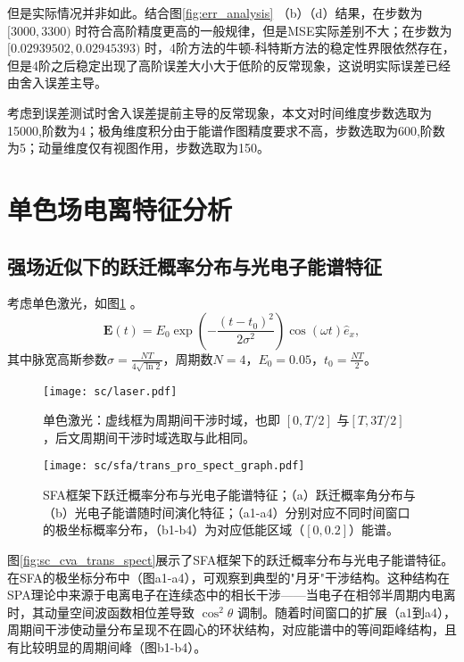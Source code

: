  但是实际情况并非如此。结合图\ref{fig:err_analysis} （b）（d）结果，在步数为$[3000, 3300)$ 时符合高阶精度更高的一般规律，但是MSE实际差别不大；在步数为$[0.02939502, 0.02945393)$ 时，4阶方法的牛顿-科特斯方法的稳定性界限依然存在，但是4阶之后稳定出现了高阶误差大小大于低阶的反常现象，这说明实际误差已经由舍入误差主导。

考虑到误差测试时舍入误差提前主导的反常现象，本文对时间维度步数选取为15000,阶数为4；极角维度积分由于能谱作图精度要求不高，步数选取为600,阶数为5；动量维度仅有视图作用，步数选取为150。

%
\section{单色场电离特征分析}
\subsection{强场近似下的跃迁概率分布与光电子能谱特征}
考虑单色激光，如图\ref{fig:sc_laser} 。
\begin{equation}
	\mathbf{E}(t) = E_0 \exp\left(-\frac{(t - t_0)^2}{2\sigma^2}\right) \cos(\omega t) \hat e_x,
	\label{eq:sc_laser}
\end{equation}
其中脉宽高斯参数$\sigma = \frac{NT}{4\sqrt{\ln{2}}}$，周期数$N = 4$，$E_0 = 0.05$，$t_0 = \frac{NT}{2}$。

\begin{figure}[h]  %
	\centering
	\texttt{[image: sc/laser.pdf]}
	\caption{单色激光：虚线框为周期间干涉时域，也即 $[0, T/2]$ 与$ [T, 3T/2]$ ，后文周期间干涉时域选取与此相同。}
	\label{fig:sc_laser}
\end{figure}

\begin{figure}[!htpb]  %
	\centering
	\texttt{[image: sc/sfa/trans\_pro\_spect\_graph.pdf]}
	\caption{SFA框架下跃迁概率分布与光电子能谱特征；（a）跃迁概率角分布与（b）光电子能谱随时间演化特征；（a1-a4）分别对应不同时间窗口的极坐标概率分布，（b1-b4）为对应低能区域（$[0, 0.2]$）能谱。}
	\label{fig:sc_sfa_trans_spect}
\end{figure}

图\ref{fig:sc_cva_trans_spect}展示了SFA框架下的跃迁概率分布与光电子能谱特征。在SFA的极坐标分布中（图a1-a4），可观察到典型的"月牙"干涉结构。这种结构在SPA理论中来源于电离电子在连续态中的相长干涉——当电子在相邻半周期内电离时，其动量空间波函数相位差导致  $\cos^2\theta$ 调制。随着时间窗口的扩展（a1到a4），周期间干涉使动量分布呈现不在圆心的环状结构，对应能谱中的等间距峰结构，且有比较明显的周期间峰（图b1-b4）。

